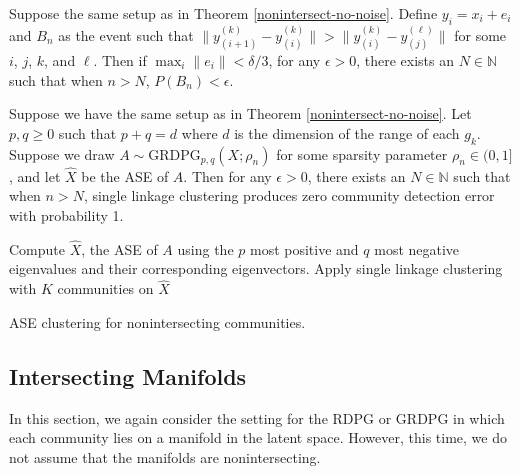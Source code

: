 \documentclass[12pt]{article}
\begin{document}
\begin{theorem}
\label{nonintersect-with-noise}
Suppose the same setup as in Theorem \ref{nonintersect-no-noise}. 
Define $y_i = x_i + e_i$ and $B_n$ as the event such that $\|y_{(i+1)}^{(k)} - y_{(i)}^{(k)}\| > \|y_{(i)}^{(k)} - y_{(j)}^{(\ell)}\|$ for some $i$, $j$, $k$, and $\ell$. 
Then if $\max_i \|e_i\| < \delta / 3$, for any $\epsilon > 0$, there exists an $N \in \mathbb{N}$ such that when $n > N$, $P(B_n) < \epsilon$. 
\end{theorem}

\begin{theorem}
\label{nonintersect-mbm}
Suppose we have the same setup as in Theorem \ref{nonintersect-no-noise}. 
Let $p, q \geq 0$ such that $p + q = d$ where $d$ is the dimension of the range of each $g_k$. 
Suppose we draw $A \sim \mathrm{GRDPG}_{p,q}(X; \rho_n)$ for some sparsity parameter $\rho_n \in (0, 1]$, and let $\hat{X}$ be the ASE of $A$. 
Then for any $\epsilon > 0$, there exists an $N \in \mathbb{N}$ such that when $n > N$, single linkage clustering produces zero community detection error with probability 1. 
\end{theorem}

\begin{algorithm}[h]
\DontPrintSemicolon
\SetAlgoLined
{}
Compute $\hat{X}$, the ASE of $A$ using the $p$ most positive and $q$ most negative eigenvalues and their corresponding eigenvectors.\;
Apply single linkage clustering with $K$ communities on $\hat{X}$\;
\caption{ASE clustering for nonintersecting communities.}
\end{algorithm}

\hypertarget{intersecting-manifolds}{%
\subsection{Intersecting Manifolds}\label{intersecting-manifolds}}

In this section, we again consider the setting for the RDPG or GRDPG in
which each community lies on a manifold in the latent space. However,
this time, we do not assume that the manifolds are nonintersecting.
\end{document}
